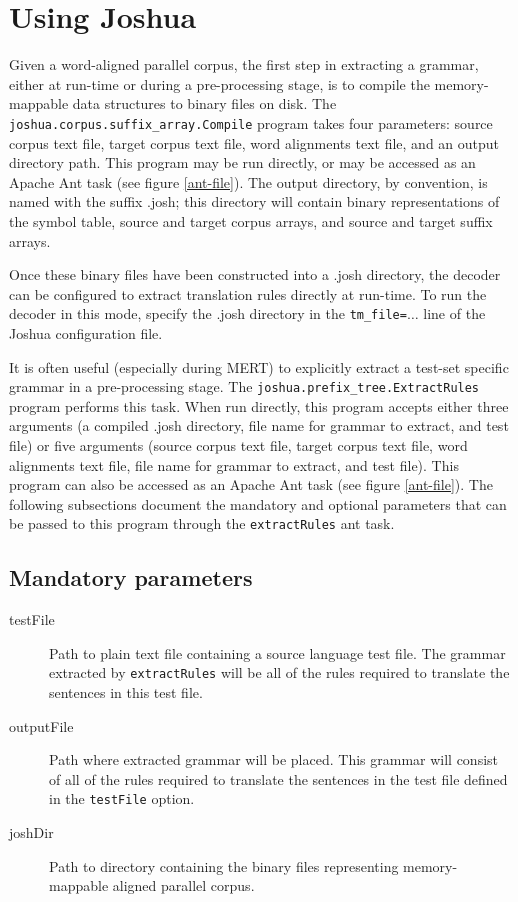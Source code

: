 \documentclass{pbml}
\begin{document}
\section{Using Joshua}
\label{using-joshua}

Given a word-aligned parallel corpus, the first step in extracting a grammar, either at run-time or during a pre-processing stage, is to compile the memory-mappable data structures to binary files on disk. The {\tt joshua.corpus.suffix\_array.Compile} program takes four parameters: source corpus text file, target corpus text file, word alignments text file, and an output directory path. This program may be run directly, or may be accessed as an Apache Ant task (see figure \ref{ant-file}). The output directory, by convention, is named with the suffix .josh; this directory will contain binary representations of the symbol table, source and target corpus arrays, and source and target suffix arrays. 

Once these binary files have been constructed into a .josh directory, the decoder can be configured to extract translation rules directly at run-time. To run the decoder in this mode, specify the .josh directory in the {\tt tm\_file=$\ldots$} line of the Joshua configuration file. 

It is often useful (especially during MERT) to explicitly extract a test-set specific grammar in a pre-processing stage. The {\tt joshua.prefix\_tree.ExtractRules} program performs this task. When run directly, this program accepts either three arguments (a compiled .josh directory, file name for grammar to extract, and test file) or five arguments (source corpus text file, target corpus text file, word alignments text file, file name for grammar to extract, and test file). This program can also be accessed as an Apache Ant task (see figure \ref{ant-file}). The following subsections document the mandatory and optional parameters that can be passed to this program through the {\tt extractRules} ant task.

\subsection{Mandatory parameters}
\begin{description}

	\item[testFile] Path to plain text file containing a source language test file. The grammar extracted by {\tt extractRules} will be all of the rules required to translate the sentences in this test file.

	\item[outputFile] Path where extracted grammar will be placed. This grammar will consist of all of the rules required to translate the sentences in the test file defined in the {\tt testFile} option.

	\item[joshDir] Path to directory containing the binary files representing memory-mappable aligned parallel corpus.

\end{description}
\end{document}
